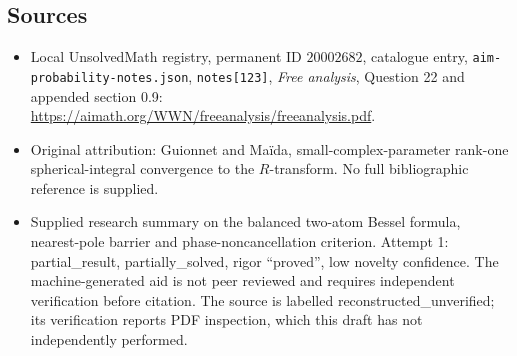 \documentclass[11pt]{article}
\begin{document}
\subsection{Sources}
\begin{itemize}
\item Local UnsolvedMath registry, permanent ID \(20002682\), catalogue entry, \texttt{aim-probability-notes.json}, \texttt{notes[123]}, \emph{Free analysis}, Question 22 and appended section 0.9: \url{https://aimath.org/WWN/freeanalysis/freeanalysis.pdf}.
\item Original attribution: Guionnet and Ma\"ida, small-complex-parameter rank-one spherical-integral convergence to the \(R\)-transform. No full bibliographic reference is supplied.
\item Supplied research summary on the balanced two-atom Bessel formula, nearest-pole barrier and phase-noncancellation criterion. Attempt 1: partial\_result, partially\_solved, rigor ``proved'', low novelty confidence. The machine-generated aid is not peer reviewed and requires independent verification before citation. The source is labelled reconstructed\_unverified; its verification reports PDF inspection, which this draft has not independently performed.
\end{itemize}
\end{document}
